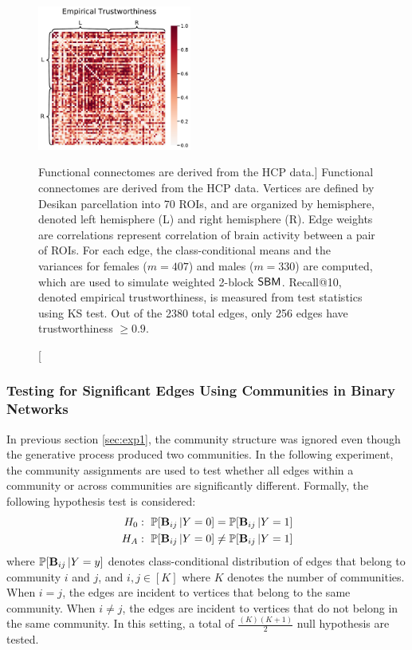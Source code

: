 \begin{figure}
    \centering
    \includegraphics[width=0.45\textwidth]{figures/dnd/exp2_empirical_trustworthiness}
    \caption
    [Functional connectomes are derived from the HCP data.]
    {Functional connectomes are derived from the HCP data. Vertices are defined by Desikan parcellation into 70 ROIs, and are organized by hemisphere, denoted left hemisphere (L) and right hemisphere (R). Edge weights are correlations represent correlation of brain activity between a pair of ROIs. 
    For each edge, the class-conditional means and the variances for females ($m=407$) and males ($m=330$) are computed, which are used to simulate weighted 2-block $\operatorname{\mathsf{SBM}}$. Recall@10, denoted empirical trustworthiness, is measured from test statistics using KS test. Out of the 2380 total edges, only 256 edges have trustworthiness $\geq 0.9$. 
    }
    \label{fig:exp2_hcp}
\end{figure}

\subsubsection{Testing for Significant Edges Using Communities in Binary Networks} \label{sec:exp3}
In previous section \ref{sec:exp1}, the community structure was ignored even though the generative process produced two communities. In the following experiment, the community assignments are used to test whether all edges within a community or across communities are significantly different. Formally, the following hypothesis test is considered: 
\begin{align*}
    H_0:~ \mathbb{P}[\operatorname{\mathbf{B}}_{ij}|Y=0] = \mathbb{P}[\operatorname{\mathbf{B}}_{ij}|Y=1]\\
    H_A:~  \mathbb{P}[\operatorname{\mathbf{B}}_{ij}|Y=0]\neq \mathbb{P}[\operatorname{\mathbf{B}}_{ij}|Y=1]
\end{align*}
where $\mathbb{P}[\operatorname{\mathbf{B}}_{ij}|Y=y]$ denotes class-conditional distribution of edges that belong to community $i$ and $j$, and $i, j\in [K]$ where $K$ denotes the number of communities. When $i =j$, the edges are incident to vertices that belong to the same community. When $i\neq j$, the edges are incident to vertices that do not belong in the same community. In this setting, a total of $\frac{(K)(K+1)}{2}$ null hypothesis are tested.  

